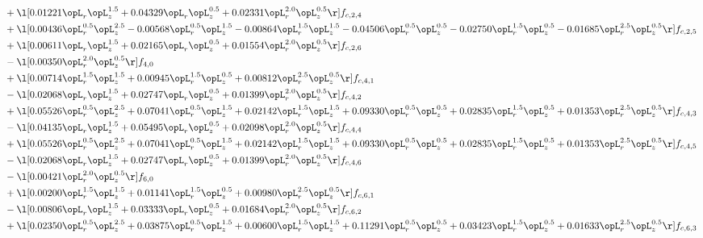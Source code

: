 \begin{alignat}{2}
& + \l[  0.01221 \opL_r \opL_z^{1.5} +  0.04329 \opL_r \opL_z^{0.5} +  0.02331 \opL_r^{2.0} \opL_z^{0.5}  \r] f_{c,2,4} \nonumber \\ 
& + \l[  0.00436 \opL_r^{0.5} \opL_z^{2.5}   -0.00568 \opL_r^{0.5} \opL_z^{1.5}   -0.00864 \opL_r^{1.5} \opL_z^{1.5}   -0.04506 \opL_r^{0.5} \opL_z^{0.5}   -0.02750 \opL_r^{1.5} \opL_z^{0.5}   -0.01685 \opL_r^{2.5} \opL_z^{0.5}  \r] f_{c,2,5} \nonumber \\ 
& + \l[  0.00611 \opL_r \opL_z^{1.5} +  0.02165 \opL_r \opL_z^{0.5} +  0.01554 \opL_r^{2.0} \opL_z^{0.5}  \r] f_{c,2,6} \nonumber \\ 
& - \l[  0.00350 \opL_r^{2.0} \opL_z^{0.5}  \r] f_{4,0} \nonumber \\ 
& + \l[  0.00714 \opL_r^{1.5} \opL_z^{1.5} +  0.00945 \opL_r^{1.5} \opL_z^{0.5} +  0.00812 \opL_r^{2.5} \opL_z^{0.5}  \r] f_{c,4,1} \nonumber \\ 
& - \l[  0.02068 \opL_r \opL_z^{1.5} +  0.02747 \opL_r \opL_z^{0.5} +  0.01399 \opL_r^{2.0} \opL_z^{0.5}  \r] f_{c,4,2} \nonumber \\ 
& + \l[  0.05526 \opL_r^{0.5} \opL_z^{2.5} +  0.07041 \opL_r^{0.5} \opL_z^{1.5} +  0.02142 \opL_r^{1.5} \opL_z^{1.5} +  0.09330 \opL_r^{0.5} \opL_z^{0.5} +  0.02835 \opL_r^{1.5} \opL_z^{0.5} +  0.01353 \opL_r^{2.5} \opL_z^{0.5}  \r] f_{c,4,3} \nonumber \\ 
& - \l[  0.04135 \opL_r \opL_z^{1.5} +  0.05495 \opL_r \opL_z^{0.5} +  0.02098 \opL_r^{2.0} \opL_z^{0.5}  \r] f_{c,4,4} \nonumber \\ 
& + \l[  0.05526 \opL_r^{0.5} \opL_z^{2.5} +  0.07041 \opL_r^{0.5} \opL_z^{1.5} +  0.02142 \opL_r^{1.5} \opL_z^{1.5} +  0.09330 \opL_r^{0.5} \opL_z^{0.5} +  0.02835 \opL_r^{1.5} \opL_z^{0.5} +  0.01353 \opL_r^{2.5} \opL_z^{0.5}  \r] f_{c,4,5} \nonumber \\ 
& - \l[  0.02068 \opL_r \opL_z^{1.5} +  0.02747 \opL_r \opL_z^{0.5} +  0.01399 \opL_r^{2.0} \opL_z^{0.5}  \r] f_{c,4,6} \nonumber \\ 
& - \l[  0.00421 \opL_r^{2.0} \opL_z^{0.5}  \r] f_{6,0} \nonumber \\ 
& + \l[  0.00200 \opL_r^{1.5} \opL_z^{1.5} +  0.01141 \opL_r^{1.5} \opL_z^{0.5} +  0.00980 \opL_r^{2.5} \opL_z^{0.5}  \r] f_{c,6,1} \nonumber \\ 
& - \l[  0.00806 \opL_r \opL_z^{1.5} +  0.03333 \opL_r \opL_z^{0.5} +  0.01684 \opL_r^{2.0} \opL_z^{0.5}  \r] f_{c,6,2} \nonumber \\ 
& + \l[  0.02350 \opL_r^{0.5} \opL_z^{2.5} +  0.03875 \opL_r^{0.5} \opL_z^{1.5} +  0.00600 \opL_r^{1.5} \opL_z^{1.5} +  0.11291 \opL_r^{0.5} \opL_z^{0.5} +  0.03423 \opL_r^{1.5} \opL_z^{0.5} +  0.01633 \opL_r^{2.5} \opL_z^{0.5}  \r] f_{c,6,3} \nonumber \\ 

\end{alignat}
